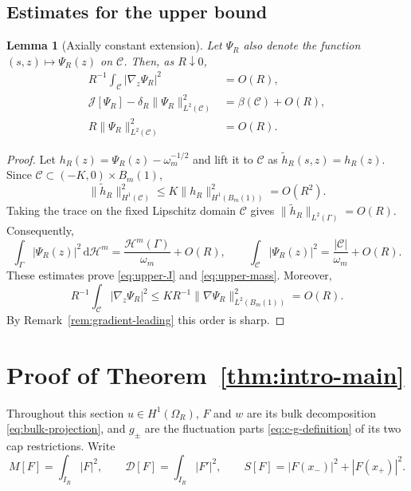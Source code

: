 \documentclass[11pt,a4paper]{article}
\numberwithin{equation}{section}
\theoremstyle{paperplain}
\newtheorem{lemma}[theorem]{Lemma}
\theoremstyle{remark}
\newcommand{\C}{\mathcal{C}}
\newcommand{\HH}{\mathcal{H}}
\newcommand{\dd}{\,\mathrm d}
\begin{document}
\subsection{Estimates for the upper bound}
\begin{lemma}[Axially constant extension]\label{lem:cap-upper}
Let $\Psi_R$ also denote the function $(s,z)\mapsto\Psi_R(z)$ on $\C$.
Then, as $R\downarrow0$,
\begin{align}
 R^{-1}\int_{\C}|\nabla_z\Psi_R|^2&=O(R),\label{eq:upper-gradient}\\
 \mathcal J[\Psi_R]-\delta_R\|\Psi_R\|_{L^2(\C)}^2
   &=\beta(\C)+O(R),\label{eq:upper-J}\\
 R\|\Psi_R\|_{L^2(\C)}^2&=O(R).\label{eq:upper-mass}
\end{align}
\end{lemma}

\begin{proof}
Let $h_R(z)=\Psi_R(z)-\omega_m^{-1/2}$ and lift it to $\C$ as
$\widetilde h_R(s,z)=h_R(z)$. Since
$\C\subset(-K,0)\times B_m(1)$,
\begin{equation}\label{eq:lift}
 \|\widetilde h_R\|_{H^1(\C)}^2
 \le K\|h_R\|_{H^1(B_m(1))}^2=O(R^2).
\end{equation}
Taking the trace on the fixed Lipschitz domain $\C$ gives
$\|\widetilde h_R\|_{L^2(\Gamma)}=O(R)$. Consequently,
\[
 \int_\Gamma|\Psi_R(z)|^2\dd\HH^m
   =\frac{\HH^m(\Gamma)}{\omega_m}+O(R),\qquad
 \int_{\C}|\Psi_R(z)|^2
   =\frac{|\C|}{\omega_m}+O(R).
\]
These estimates prove \eqref{eq:upper-J} and \eqref{eq:upper-mass}. Moreover,
\[
 R^{-1}\int_{\C}|\nabla_z\Psi_R|^2
 \le KR^{-1}\|\nabla\Psi_R\|_{L^2(B_m(1))}^2=O(R).
\]
By Remark~\ref{rem:gradient-leading} this order is sharp.
\end{proof}

\section{Proof of Theorem~\ref{thm:intro-main}}\label{sec:proof}

Throughout this section $u\in H^1(\Omega_R)$, $F$ and $w$ are its bulk
decomposition \eqref{eq:bulk-projection}, and $g_\pm$ are the fluctuation
parts \eqref{eq:c-g-definition} of its two cap restrictions. Write
\[
 M[F]=\int_{I_R}|F|^2,\qquad \mathcal D[F]=\int_{I_R}|F'|^2,\qquad
 S[F]=|F(x_-)|^2+|F(x_+)|^2 .
\]
\end{document}
